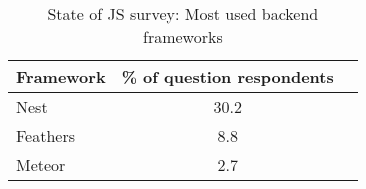 \begin{table}[ht]
\centering
\caption{State of JS survey: Most used backend frameworks \parencite{mostUsedBackendFrameworks22}}
\label{tab:backendFrameworksRanking}
\begin{tabular}[t]{lcc}
\toprule
Framework & \% of question respondents\\
\midrule
Nest & 30.2\\
Feathers & 8.8\\
Meteor & 2.7\\
\bottomrule
\end{tabular}
\end{table}
